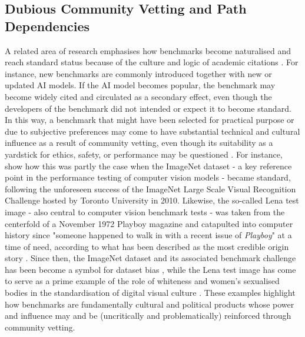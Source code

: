 

\subsection{Dubious Community Vetting and Path Dependencies}

A related area of research emphasises how benchmarks become naturalised and reach standard status %
because of the culture and logic of academic citations \cite{orr2024a}. For instance, new benchmarks are commonly introduced together with new or updated AI models. If the AI model becomes popular, the benchmark may become widely cited and circulated as a secondary effect, even though the developers of the benchmark did not intended or expect it to become standard. In this way, a benchmark that might have been selected for practical purpose or due to subjective preferences may come to have substantial technical and cultural influence as a result of community vetting, even though its suitability as a yardstick for ethics, safety, or performance may be questioned \cite{orr2024a, orr2024}. For instance, \citet{denton2021} show how this was partly the case when the ImageNet dataset - a key reference point in the performance testing of computer vision models - became standard, following  the unforeseen success of the ImageNet Large Scale Visual Recognition Challenge hosted by Toronto University in 2010. Likewise, the so-called Lena test image - also central to computer vision benchmark tests - was taken from the centerfold of a November 1972 Playboy magazine and catapulted into computer history since "someone happened to walk in with a recent issue of \textit{Playboy}" at a time of need, according to what has been described as the most credible origin story \cite[p.~80]{mulvin2021}.
Since then, the ImageNet dataset and its associated benchmark challenge has been become a symbol for dataset bias \cite{denton2021}, while the Lena test image has come to serve as a prime example of the role of whiteness and women's sexualised bodies in the standardisation of digital visual culture \cite{mulvin2021}. These examples highlight how benchmarks are fundamentally cultural and political products whose power and influence may and be (uncritically and problematically) reinforced through community vetting. 

